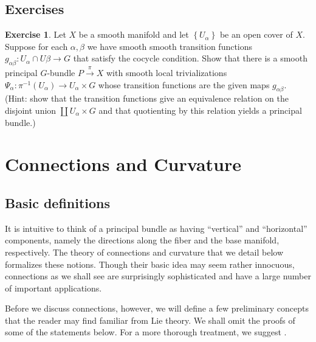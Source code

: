 \documentclass{book}
\theoremstyle{plain}
\theoremstyle{definition}
\newtheorem{exc}{Exercise}
\theoremstyle{remark}
\begin{document}
\section{Exercises}

\begin{exc}
    \label{exc:bundleconst}
    Let $X$ be a smooth manifold and let $\left\{ U_\alpha \right\}$ be an open cover of $X$. Suppose for each
    $\alpha,\beta$ we have smooth smooth transition functions $g_{\alpha\beta}:U_\alpha\cap U\beta\to G$ that
    satisfy the cocycle condition. Show that there is a smooth principal $G$-bundle $P\xrightarrow{\pi} X$ with smooth local
    trivializations $\Psi_\alpha:\pi^{-1}(U_\alpha)\to U_\alpha\times G$ whose transition functions are the given maps
    $g_{\alpha\beta}$. (Hint: show that the transition functions give an equivalence relation on the disjoint union
    $\coprod U_\alpha\times G$ and that quotienting by this relation yields a principal bundle.)
\end{exc}



\chapter{Connections and Curvature}

\section{Basic definitions}

It is intuitive to think of a principal bundle as having ``vertical''  and ``horizontal'' components, namely the directions along the fiber and the base manifold,
respectively. The theory of connections and curvature that we detail below formalizes these notions. Though their basic idea may seem rather
innocuous, connections as we shall see are surprisingly sophisticated and have a large number of important applications. 

Before we discuss connections, however, we will define a few preliminary concepts that the reader may find familiar from Lie theory.
We shall omit the proofs of some of the statements below. For a more thorough treatment, we suggest .
\end{document}
